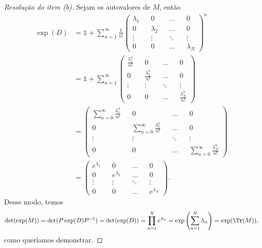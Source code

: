 \begin{proof}[Resolução do item (b)]
    Sejam  os autovalores de \(M\), então
    \begin{align*}
        \exp(D) &= \mathds{1} + \sum_{n=1}^\infty \frac{1}{n!} \begin{pmatrix}
            \lambda_1 && 0 && \dots && 0\\
            0 && \lambda_2 && \dots && 0\\
            \vdots && \vdots && \ddots && \vdots \\
            0 && 0 && \dots && \lambda_N
        \end{pmatrix}^n\\
                &= \mathds{1} + \sum_{n=1}^\infty \begin{pmatrix}
                    \frac{\lambda_1^n}{n!} && 0 && \dots && 0\\
                    0 && \frac{\lambda_2^n}{n!} && \dots && 0\\
            \vdots && \vdots && \ddots && \vdots \\
            0 && 0 && \dots && \frac{\lambda_N^n}{n!}
        \end{pmatrix}\\
                &=  \begin{pmatrix}
                   \sum_{n=0}^\infty \frac{\lambda_1^n}{n!} && 0 && \dots && 0\\
                    0 && \sum_{n=0}^\infty\frac{\lambda_2^n}{n!} && \dots && 0\\
            \vdots && \vdots && \ddots && \vdots \\
            0 && 0 && \dots && \sum_{n=0}^\infty\frac{\lambda_N^n}{n!}
        \end{pmatrix}\\
                &= \begin{pmatrix}
                    e^{\lambda_1} && 0 && \dots && 0\\
                    0 && e^{\lambda_2} && \dots && 0\\
            \vdots && \vdots && \ddots && \vdots \\
            0 && 0 && \dots && e^{\lambda_N}
                \end{pmatrix}.
    \end{align*}
    Desse modo, temos
    \begin{equation*}
        \det(\exp(M)) = \det(P\exp(D)P^{-1}) = \det(\exp(D)) = \prod_{n = 1}^{N} e^{\lambda_n} = \exp{\left(\sum_{n=1}^N \lambda_n\right)} = \exp(\Tr(M)),
    \end{equation*}
    como queríamos demonstrar.
\end{proof}
